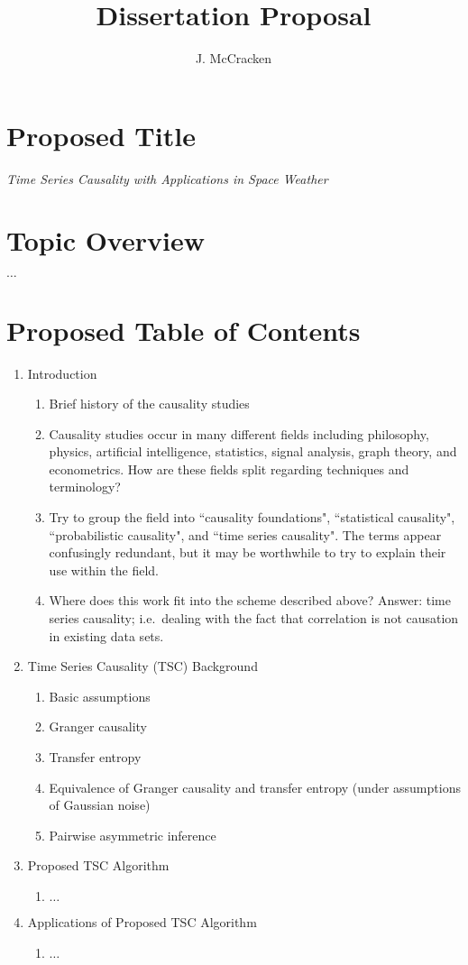 \documentclass[letter,11pt]{article}
\title{Dissertation Proposal}
\author{J. McCracken}
\begin{document}

\noindent\makebox[\linewidth]{\rule{\paperwidth}{0.4pt}}

\section*{Proposed Title}
{\em Time Series Causality with Applications in Space Weather}

\section*{Topic Overview}
$\ldots$

\section*{Proposed Table of Contents}
\begin{enumerate}
	\item Introduction
	\begin{enumerate}
		\item Brief history of the causality studies
		\item Causality studies occur in many different fields including philosophy, physics, artificial intelligence, statistics, signal analysis, graph theory, and econometrics.  How are these fields split regarding techniques and terminology?
		\item Try to group the field into ``causality foundations", ``statistical causality", ``probabilistic causality", and ``time series causality".  The terms appear confusingly redundant, but it may be worthwhile to try to explain their use within the field.
		\item Where does this work fit into the scheme described above?  Answer: time series causality; i.e.\ dealing with the fact that correlation is not causation in existing data sets.
	\end{enumerate}
	\item Time Series Causality (TSC) Background
	\begin{enumerate}
		\item Basic assumptions
		\item Granger causality
		\item Transfer entropy
		\item Equivalence of Granger causality and transfer entropy (under assumptions of Gaussian noise)
		\item Pairwise asymmetric inference
	\end{enumerate}
	\item Proposed TSC Algorithm 
	\begin{enumerate}
		\item $\ldots$
	\end{enumerate}
	\item Applications of Proposed TSC Algorithm
	\begin{enumerate}
		\item $\ldots$
	\end{enumerate}
\end{enumerate}
\end{document}
